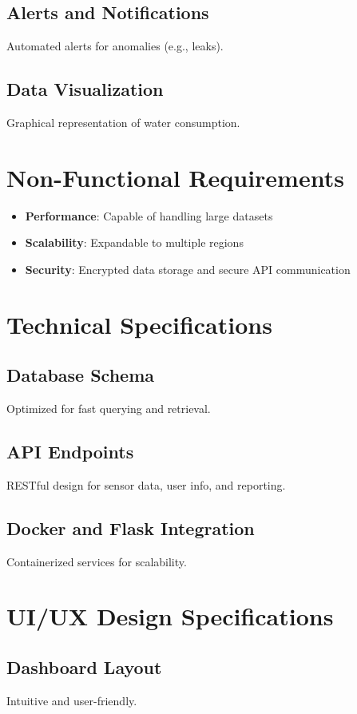 \documentclass{article}
\begin{document}
\subsection{Alerts and Notifications}
Automated alerts for anomalies (e.g., leaks).

\subsection{Data Visualization}
Graphical representation of water consumption.

\section{Non-Functional Requirements}
\begin{itemize}
\item \textbf{Performance}: Capable of handling large datasets
\item \textbf{Scalability}: Expandable to multiple regions
\item \textbf{Security}: Encrypted data storage and secure API communication
\end{itemize}

\section{Technical Specifications}
\subsection{Database Schema}
Optimized for fast querying and retrieval.

\subsection{API Endpoints}
RESTful design for sensor data, user info, and reporting.

\subsection{Docker and Flask Integration}
Containerized services for scalability.

\section{UI/UX Design Specifications}
\subsection{Dashboard Layout}
Intuitive and user-friendly.
\end{document}
